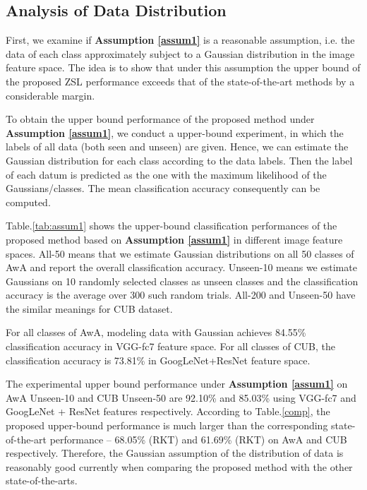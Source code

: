 \documentclass{article}
\begin{document}
\subsection{Analysis of Data Distribution}
First, we examine if \textbf{Assumption \ref{assum1}} is a reasonable assumption, i.e. the data of each class approximately subject to a Gaussian distribution in the image feature space. The idea is to show that under this assumption the upper bound of the proposed ZSL performance exceeds that of the state-of-the-art methods by a considerable margin.

To obtain the upper bound performance of the proposed method under \textbf{Assumption \ref{assum1}}, we conduct a upper-bound experiment, in which the labels of all data (both seen and unseen) are given. Hence, we can estimate the Gaussian distribution for each class according to the data labels. Then the label of each datum is predicted as the one with the maximum likelihood of the Gaussians/classes. The mean classification accuracy consequently can be computed.

Table.\ref{tab:assum1} shows the upper-bound classification performances of the proposed method based on \textbf{Assumption \ref{assum1}} in different image feature spaces. All-50 means that we estimate Gaussian distributions on all 50 classes of AwA and report the overall classification accuracy. Unseen-10 means we estimate Gaussians on 10 randomly selected classes as unseen classes and the classification accuracy is the average over 300 such random trials. All-200 and Unseen-50 have the similar meanings for CUB dataset.

For all classes of AwA, modeling data with Gaussian achieves 84.55\% classification accuracy in VGG-fc7 feature space. For all classes of CUB, the classification accuracy is 73.81\% in GoogLeNet+ResNet feature space.

The experimental upper bound performance under \textbf{Assumption \ref{assum1}} on AwA Unseen-10 and CUB Unseen-50 are 92.10\% and 85.03\% using VGG-fc7 and GoogLeNet + ResNet features respectively. According to Table.\ref{comp}, the proposed upper-bound performance is much larger than the corresponding state-of-the-art performance \--- 68.05\% (RKT) and 61.69\% (RKT) on AwA and CUB respectively. Therefore, the Gaussian assumption of the distribution of data is reasonably good currently when comparing the proposed method with the other state-of-the-arts.
\end{document}

